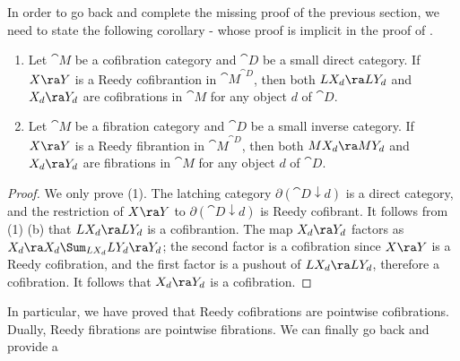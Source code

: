 In order to go back and complete the missing proof of the previous section, we need to state the following corollary - whose proof is implicit in the proof of .
\begin{cor}
\label{cor:colimdirectcorollary}
\mbox{}
\begin{enumerate}
\item
Let ${\cat M}$ be a cofibration category and ${\cat D}$ be a small direct category. If $X \ra Y$ is a Reedy cofibrantion in ${\cat M}^{\cat D}$, then both $LX_d \ra LY_d$ and $X_d \ra Y_d$ are cofibrations in ${\cat M}$ for any object $d$ of ${\cat D}$.
\item
Let ${\cat M}$ be a fibration category and ${\cat D}$ be a small inverse category. If $X \ra Y$ is a Reedy fibrantion in ${\cat M}^{\cat D}$, then both $MX_d \ra MY_d$ and $X_d \ra Y_d$ are fibrations in ${\cat M}$ for any object $d$ of ${\cat D}$.
\end{enumerate}
\end{cor}
\begin{proof}
We only prove (1). The latching category $\partial({\cat D} \downarrow d)$ is a direct category, and the restriction of $X \ra Y$ to $\partial({\cat D} \downarrow d)$ is Reedy cofibrant. It follows from  (1) (b) that $LX_d \ra LY_d$ is a cofibrantion. The map $X_d \ra Y_d$ factors as $X_d \ra X_d \Sum_{LX_d} LY_d \ra Y_d$; the second factor is a cofibration since $X \ra Y$ is a Reedy cofibration, and the first factor is a pushout of $LX_d \ra LY_d$, therefore a cofibration. It follows that $X_d \ra Y_d$ is a cofibration.
\end{proof}

In particular, we have proved that Reedy cofibrations are pointwise cofibrations. Dually, Reedy fibrations are pointwise fibrations. We can finally go back and provide a


